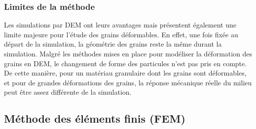 		\subsubsection{Limites de la méthode}
			Les simulations par DEM ont leurs avantages mais présentent également une limite majeure pour l'étude des grains déformables. En effet, une fois fixée au départ de la simulation, la géométrie des grains reste la même durant la simulation. Malgré les méthodes mises en place pour modéliser la déformation des grains en DEM, le changement de forme des particules n'est pas pris en compte. De cette manière, pour un matériau granulaire dont les grains sont déformables, et pour de grandes déformations des grains, la réponse mécanique réelle du milieu peut être assez différente de la simulation.
	\subsection{Méthode des éléments finis (FEM)}

